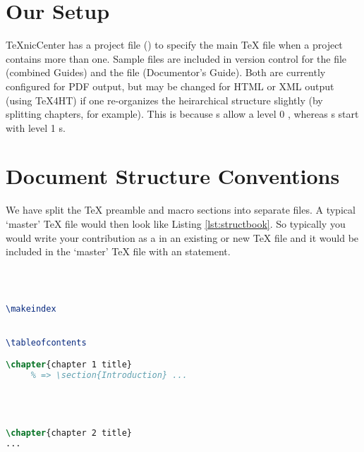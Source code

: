 \section{Our Setup}

TeXnicCenter has a project file () to specify the main \TeX{} file when a project contains more than one. Sample  files are included in version control for the  file (combined \RA{} Guides) and the  file (Documentor's Guide). Both are currently configured for PDF output, but may be changed for HTML or XML output (using TeX4HT) if one re-organizes the heirarchical structure slightly (by splitting chapters, for example). This is because  s allow a level 0 , whereas s start with level 1 s.

\section{Document Structure Conventions}

We have split the \TeX{} preamble and macro sections into separate files. A typical `master' \TeX{} file would then look like Listing \ref{lst:structbook}.
So typically you would write your contribution as a  in an existing or new \TeX{} file and it would be included in the `master' \TeX{} file with an  statement.

\begin{framed}
\begin{lstlisting}[label=lst:structbook, caption={Document Structure Sample: book documentstyle}, language=TeX]



\makeindex


\tableofcontents

\chapter{chapter 1 title}
     % => \section{Introduction} ...




\chapter{chapter 2 title}
...


\end{lstlisting}
\end{framed}


